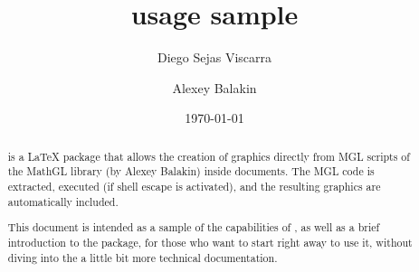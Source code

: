 \documentclass{article}
\title{\mglTeX*{} usage sample}
\author{Diego Sejas Viscarra \and Alexey Balakin}
\date{\today}
\begin{document}
	
	\maketitle
	
	\begin{abstract}
		\noindent \mglTeX{} is a \LaTeX{} package that allows the creation of graphics directly from MGL scripts of the MathGL library (by Alexey Balakin) inside documents. The MGL code is extracted, executed (if shell escape is activated), and the resulting graphics are automatically included.
		
		This document is intended as a sample of the capabilities of \mglTeX{}, as well as a brief introduction to the package, for those who want to start right away to use it, without diving into the a little bit more technical documentation.
	\end{abstract}
	
\end{document}
